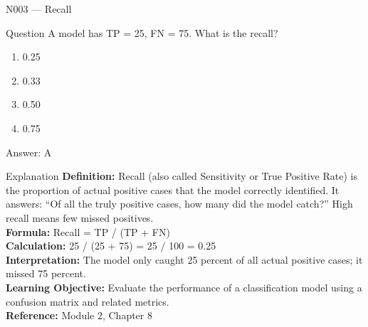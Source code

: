 \documentclass[aspectratio=169,8pt]{beamer}
\begin{document}
	\begin{frame}{N003 --- Recall}
		\begin{block}{Question}
			A model has TP = 25, FN = 75. What is the recall?
			\begin{enumerate}
				\item 0.25
				\item 0.33
				\item 0.50
				\item 0.75
			\end{enumerate}
		\end{block}
		\begin{exampleblock}{Answer: A}\end{exampleblock}
		\begin{block}{Explanation}
			\textbf{Definition:} Recall (also called Sensitivity or True Positive Rate) is the proportion of actual positive cases that the model correctly identified. It answers: ``Of all the truly positive cases, how many did the model catch?'' High recall means few missed positives.\\
			\textbf{Formula:} Recall = TP / (TP + FN)\\
			\textbf{Calculation:} 25 / (25 + 75) = 25 / 100 = 0.25\\
			\textbf{Interpretation:} The model only caught 25 percent of all actual positive cases; it missed 75 percent.\\
			\textbf{Learning Objective:} Evaluate the performance of a classification model using a confusion matrix and related metrics.\\
			\textbf{Reference:} Module 2, Chapter 8
		\end{block}
	\end{frame}
	
\end{document}
